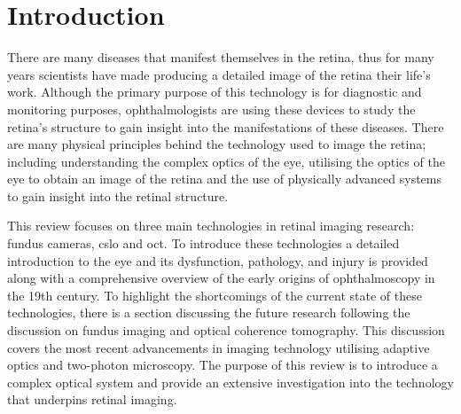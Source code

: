 \chapter{Introduction}

\label{intro}

There are many diseases that manifest themselves  in the  retina, thus
for many years scientists have made producing a detailed image of the
retina their life's work.  Although the primary  purpose of this technology
is for diagnostic and monitoring purposes, ophthalmologists are using
these devices to study the retina's structure to gain insight into the
manifestations of these diseases.  There are many physical principles
behind the technology used to image the retina; including understanding
the complex optics of the eye, utilising the optics of the eye to obtain an
image of the retina and the use of physically advanced systems to gain
insight into the retinal structure.

This review focuses on three main technologies in retinal 
imaging research: fundus cameras, \gls{cslo} and \Gls{oct}.
To introduce these technologies a detailed introduction 
to the eye and its dysfunction, pathology, and injury is provided 
along with a comprehensive overview of the early origins of 
ophthalmoscopy in the 19th century.  To highlight the shortcomings 
of the current state of these technologies, there is a section discussing 
the future research following the discussion on fundus imaging and 
optical coherence tomography.  This discussion covers the 
most recent advancements in imaging technology utilising adaptive 
optics and two-photon microscopy.  The purpose of this review is to 
introduce a complex optical system and provide an extensive 
investigation into the technology that underpins retinal imaging.
